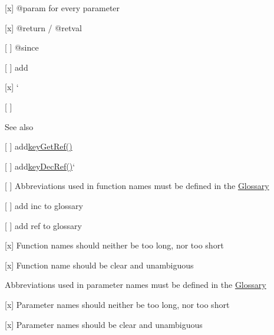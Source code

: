 \begin{DoxyItemize}
\begin{DoxyItemize}
\end{DoxyItemize}
\item \mbox{[}x\mbox{]} {\ttfamily @param} for every parameter
\item \mbox{[}x\mbox{]} {\ttfamily @return} / {\ttfamily @retval}
\item \mbox{[} \mbox{]} {\ttfamily @since}
\begin{DoxyItemize}
\item \mbox{[} \mbox{]} add
\end{DoxyItemize}
\item \mbox{[}x\mbox{]} `{\ttfamily }
\item {\ttfamily \mbox{[} \mbox{]}}\begin{DoxySeeAlso}{See also}
{\ttfamily 
\begin{DoxyItemize}
\item \mbox{[} \mbox{]} add\hyperlink{group__key_ga4aabc4272506dd63161db2bbb42de8ae}{key\+Get\+Ref()}{\ttfamily }
\item {\ttfamily \mbox{[} \mbox{]} add}\hyperlink{group__key_ga2c6433ca22109e4e141946057eccb283}{key\+Dec\+Ref()}`
\end{DoxyItemize}}
\end{DoxySeeAlso}

\end{DoxyItemize}

{\ttfamily 
\begin{DoxyItemize}
\item \mbox{[} \mbox{]} Abbreviations used in function names must be defined in the \hyperlink{doc_help_elektra-glossary_md}{Glossary}
\begin{DoxyItemize}
\item \mbox{[} \mbox{]} add inc to glossary
\item \mbox{[} \mbox{]} add ref to glossary
\end{DoxyItemize}
\item \mbox{[}x\mbox{]} Function names should neither be too long, nor too short
\item \mbox{[}x\mbox{]} Function name should be clear and unambiguous
\item Abbreviations used in parameter names must be defined in the \hyperlink{doc_help_elektra-glossary_md}{Glossary}
\item \mbox{[}x\mbox{]} Parameter names should neither be too long, nor too short
\item \mbox{[}x\mbox{]} Parameter names should be clear and unambiguous
\end{DoxyItemize}}

